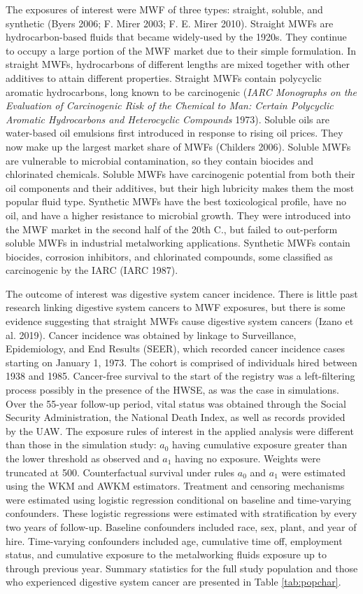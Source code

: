 \documentclass[
  11pt,
]{article}
\begin{document}
The exposures of interest were MWF of three types: straight, soluble,
and synthetic (Byers 2006; F. Mirer 2003; F. E. Mirer 2010). Straight
MWFs are hydrocarbon-based fluids that became widely-used by the 1920s.
They continue to occupy a large portion of the MWF market due to their
simple formulation. In straight MWFs, hydrocarbons of different lengths
are mixed together with other additives to attain different properties.
Straight MWFs contain polycyclic aromatic hydrocarbons, long known to be
carcinogenic (\emph{IARC Monographs on the Evaluation of Carcinogenic
Risk of the Chemical to Man: Certain Polycyclic Aromatic Hydrocarbons
and Heterocyclic Compounds} 1973). Soluble oils are water-based oil
emulsions first introduced in response to rising oil prices. They now
make up the largest market share of MWFs (Childers 2006). Soluble MWFs
are vulnerable to microbial contamination, so they contain biocides and
chlorinated chemicals. Soluble MWFs have carcinogenic potential from
both their oil components and their additives, but their high lubricity
makes them the most popular fluid type. Synthetic MWFs have the best
toxicological profile, have no oil, and have a higher resistance to
microbial growth. They were introduced into the MWF market in the second
half of the 20th C., but failed to out-perform soluble MWFs in
industrial metalworking applications. Synthetic MWFs contain biocides,
corrosion inhibitors, and chlorinated compounds, some classified as
carcinogenic by the IARC (IARC 1987).

The outcome of interest was digestive system cancer incidence. There is
little past research linking digestive system cancers to MWF exposures,
but there is some evidence suggesting that straight MWFs cause digestive
system cancers (Izano et al. 2019). Cancer incidence was obtained by
linkage to Surveillance, Epidemiology, and End Results (SEER), which
recorded cancer incidence cases starting on January 1, 1973. The cohort
is comprised of individuals hired between 1938 and 1985. Cancer-free
survival to the start of the registry was a left-filtering process
possibly in the presence of the HWSE, as was the case in simulations.
Over the 55-year follow-up period, vital status was obtained through the
Social Security Administration, the National Death Index, as well as
records provided by the UAW. The exposure rules of interest in the
applied analysis were different than those in the simulation study:
\(a_0\) having cumulative exposure greater than the lower threshold as
observed and \(a_1\) having no exposure. Weights were truncated at 500.
Counterfactual survival under rules \(a_0\) and \(a_1\) were estimated
using the WKM and AWKM estimators. Treatment and censoring mechanisms
were estimated using logistic regression conditional on baseline and
time-varying confounders. These logistic regressions were estimated with
stratification by every two years of follow-up. Baseline confounders
included race, sex, plant, and year of hire. Time-varying confounders
included age, cumulative time off, employment status, and cumulative
exposure to the metalworking fluids exposure up to through previous
year. Summary statistics for the full study population and those who
experienced digestive system cancer are presented in Table
\ref{tab:popchar}.
\end{document}
